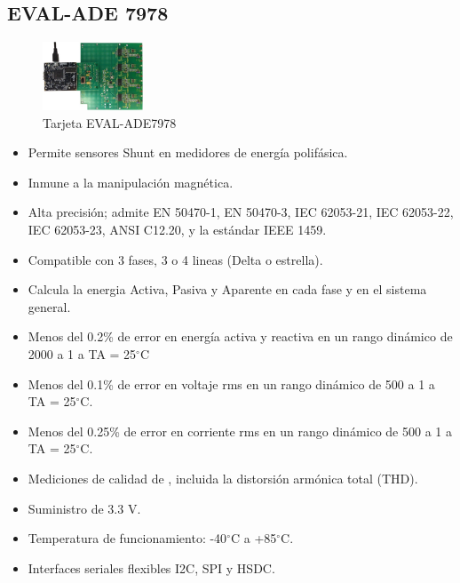     \subsection{EVAL-ADE 7978}
        \begin{figure}[H]
            \centering
            \includegraphics[width = 3cm]{3Proyecto/EVAL-ADE7978}
            \caption{Tarjeta EVAL-ADE7978} 
            \label{fig:EVAL-ADE7978}
        \end{figure}
        \begin{itemize}
            \itemsep0em
            \item Permite sensores Shunt en medidores de energía polifásica. 
            \item Inmune a la manipulación magnética.
            \item Alta precisión; admite EN 50470-1, EN 50470-3, IEC 62053-21, IEC 62053-22, IEC 62053-23, ANSI C12.20, y la estándar IEEE 1459.
            \item Compatible con 3 fases, 3 o 4 lineas (Delta o estrella).
            \item Calcula la energia Activa, Pasiva y Aparente en cada fase y en el sistema general.
            \item Menos del 0.2\% de error en energía activa y reactiva en un rango dinámico de 2000 a 1 a TA = 25$^{\circ}$C
            \item Menos del 0.1\% de error en voltaje rms en un rango dinámico de 500 a 1 a TA = 25$^{\circ}$C.
            \item Menos del 0.25\% de error en corriente rms en un rango dinámico de 500 a 1 a TA = 25$^{\circ}$C.
            \item Mediciones de calidad  de , incluida  la distorsión armónica total (THD).
            \item Suministro de 3.3 V.
            \item Temperatura de funcionamiento: -40$^{\circ}$C a +85$^{\circ}$C. 
            \item Interfaces seriales flexibles I2C, SPI y HSDC.
        \end{itemize}
